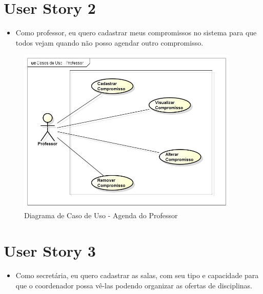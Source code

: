 \documentclass{abnt}
\begin{document}
	\clearpage	
	\section{User Story 2}

		\begin{itemize}
			\item Como professor, eu quero cadastrar meus compromissos no sistema para que todos vejam quando não posso agendar outro compromisso.
		\end{itemize}
			
	
		\begin{figure}[h]
			\begin{center}
				 \includegraphics[width=400px]{casoUsoProfessor}
				 \caption{Diagrama de Caso de Uso - Agenda do Professor}
				 \label{fig:casoUsoAgendaProfessor}
			\end{center}
		\end{figure}
		\FloatBarrier
	\clearpage
	\section{User Story 3}

		\begin{itemize}
			\item Como secretária, eu quero cadastrar as salas, com seu tipo e capacidade para que o coordenador possa vê-las podendo organizar as ofertas de disciplinas.
		\end{itemize}
	
\end{document}
